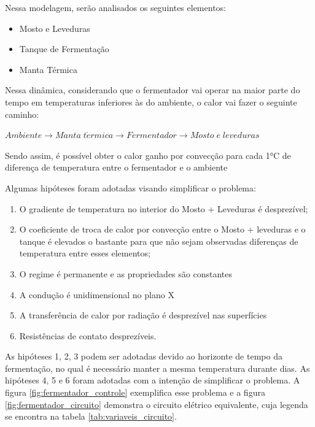 Nessa modelagem, serão analisados os seguintes elementos: 
\begin{itemize}
    \item Mosto e Leveduras 
    \item Tanque de Fermentação 
    \item Manta Térmica 
\end{itemize}

Nessa dinâmica, considerando que o fermentador vai operar na maior parte do tempo em temperaturas inferiores às do ambiente, o calor vai fazer o seguinte caminho:

\begin{center}
    \(Ambiente \longrightarrow Manta\;t\acute{e}rmica \longrightarrow Fermentador \longrightarrow Mosto\;e\;leveduras\)
\end{center}
    


Sendo assim, é possível obter o calor ganho por convecção para cada 1°C de diferença de temperatura entre o fermentador e o ambiente


Algumas hipóteses foram adotadas visando simplificar o problema: 

\begin{enumerate}
    \item O gradiente de temperatura no interior do Mosto + Leveduras é desprezível; 
    \item O coeficiente de troca de calor por convecção entre o Mosto + leveduras e o tanque é elevados o bastante para que não sejam observadas diferenças de temperatura entre esses elementos; 
    \item O regime é permanente e as propriedades são constantes 
    \item A condução é unidimensional no plano X
    \item A transferência de calor por radiação é desprezível nas superfícies 
    \item Resistências de contato desprezíveis.
\end{enumerate}


As hipóteses 1, 2, 3  podem ser adotadas devido ao horizonte de tempo da fermentação, no qual é necessário manter a mesma temperatura durante dias. As hipóteses 4, 5 e 6 foram adotadas com a intenção de simplificar o problema. A figura \ref{fig:fermentador_controle} exemplifica esse problema e a figura \ref{fig:fermentador_circuito} demonstra o circuito elétrico equivalente, cuja legenda se encontra na tabela \ref{tab:variaveis_circuito}.

